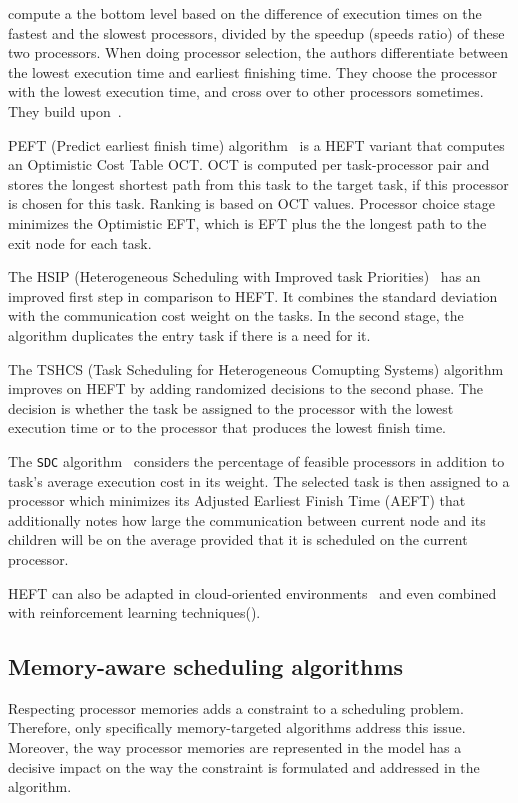 \documentclass[conference]{IEEEtran}
\begin{document}
    \cite{alebrahim2017task} compute a the bottom level based on the difference of execution times on
    the fastest and the slowest processors, divided by the speedup (speeds ratio) of these two processors.
    When doing processor selection, the authors differentiate between the lowest execution time and earliest finishing time.
    They choose the processor with the lowest execution time, and cross over to other processors sometimes.
    They build upon~\cite{shetti2013optimization}.

    PEFT (Predict earliest finish time) algorithm~\cite{arabnejad2014list} is a HEFT variant that computes an Optimistic
    Cost Table OCT.
    OCT is computed per task-processor pair and stores the longest shortest path from this task to the target task, if this
    processor is chosen for this task.
    Ranking is based on OCT values.
    Processor choice stage minimizes the Optimistic EFT, which is EFT plus the the longest path to the exit node for each task.

    The HSIP (Heterogeneous Scheduling with Improved task Priorities)~\cite{wang2016hsip} has an improved first step in
    comparison to HEFT.
    It combines the standard deviation with the communication cost weight on the tasks.
    In the second stage, the algorithm duplicates the entry task if there is a need for it.

    The TSHCS (Task Scheduling for Heterogeneous Comupting Systems) algorithm~\cite{alebrahim2017task} improves on HEFT
    by adding randomized decisions to the second phase.
    The decision is whether the task be assigned to the processor with the lowest execution time or to the processor that
    produces the lowest finish time.

    The \texttt{SDC} algorithm~\cite{SHI2006665} considers the percentage of feasible processors in addition to task’s
    average execution cost in its weight.
    The selected task is then assigned to a processor which minimizes its Adjusted Earliest Finish Time (AEFT) that
    additionally notes how large the communication between current node and its children will be on the
    average provided that it is scheduled on the current processor.


    HEFT  can also be adapted in cloud-oriented environments~\cite{samadi2018eheft} and even combined with reinforcement
    learning techniques(\cite{yano2022cqga}).

    \subsection{Memory-aware scheduling algorithms}
    Respecting processor memories adds a constraint to a scheduling problem.
    Therefore, only specifically memory-targeted algorithms address this issue.
    Moreover, the way processor memories are represented in the model has a decisive impact on the way the constraint
    is formulated and addressed in the algorithm.
\end{document}
